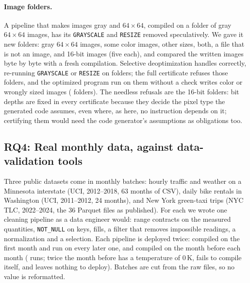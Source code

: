 \paragraph{Image folders.} A pipeline that makes images gray and $64\times64$, compiled on a folder
of gray $64\times64$ images, has its \texttt{GRAYSCALE} and \texttt{RESIZE} removed speculatively. We
gave it \ImgBatches{} new folders: gray $64\times64$ images, some color images, other sizes, both, a
file that is not an image, and 16-bit images (five each), and compared the written images byte by
byte with a fresh compilation. Selective deoptimization handles \ImgBDeoptCorrect{} correctly,
re-running \texttt{GRAYSCALE} or \texttt{RESIZE} on \ImgBDeopted{} folders; the full certificate
refuses those folders, and the optimized program run on them without a check writes color or
wrongly sized images (\ImgBTrustedUnsound{} folders). The \ImgBDeoptNeedless{} needless refusals are
the 16-bit folders: bit depths are fixed in every certificate because they decide the pixel type the
generated code assumes, even where, as here, no instruction depends on it; certifying them would need
the code generator's assumptions as obligations too.

\subsection{RQ4: Real monthly data, against data-validation tools}\label{sec:rq-real}

Three public datasets come in monthly batches: hourly traffic and weather on a Minnesota interstate
(UCI, 2012--2018, 63 months of CSV), daily bike rentals in Washington (UCI, 2011--2012, 24 months),
and New York green-taxi trips (NYC TLC, 2022--2024, the 36 Parquet files as published). For each we
wrote one cleaning pipeline as a data engineer would: range contracts on the measured quantities,
\texttt{NOT\_NULL} on keys, fills, a filter that removes impossible readings, a normalization and a
selection. Each pipeline is deployed twice: compiled on the first month and run on every later one,
and compiled on the month before each month (\RealRuns{} runs; twice the month before has a temperature of
0\,K, fails to compile itself, and leaves nothing to deploy). Batches are cut from the raw
files, so no value is reformatted.





